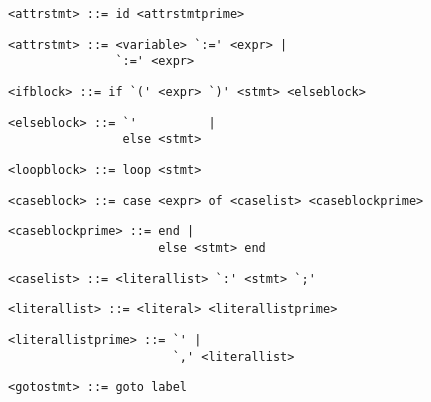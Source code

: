 \begin{footnotesize}
\begin{lstlisting}[frame=single, label={attrstmt}, language=pie]
<attrstmt> ::= id <attrstmtprime>
\end{lstlisting}

\begin{lstlisting}[frame=single, label={attrstmt}, language=pie]
<attrstmt> ::= <variable> `:=' <expr> |
               `:=' <expr>
\end{lstlisting}

\begin{lstlisting}[frame=single, label={ifblock}, language=pie]
<ifblock> ::= if `(' <expr> `)' <stmt> <elseblock> 
\end{lstlisting}


\begin{lstlisting}[frame=single, label={elseblock}, language=pie]
<elseblock> ::= `'          |
                else <stmt>
\end{lstlisting}

\begin{lstlisting}[frame=single, label={loopblock}, language=pie]
<loopblock> ::= loop <stmt>
\end{lstlisting}

\begin{lstlisting}[frame=single, label={caseblock}, language=pie]
<caseblock> ::= case <expr> of <caselist> <caseblockprime>
\end{lstlisting}

\begin{lstlisting}[frame=single, label={caseblockprime}, language=pie]
<caseblockprime> ::= end |
                     else <stmt> end
\end{lstlisting}

\begin{lstlisting}[frame=single, label={caselist}, language=pie]
<caselist> ::= <literallist> `:' <stmt> `;'
\end{lstlisting}

\begin{lstlisting}[frame=single, label={literallist}, language=pie]
<literallist> ::= <literal> <literallistprime>
\end{lstlisting}

\begin{lstlisting}[frame=single, label={literallistprime}, language=pie]
<literallistprime> ::= `' |
                       `,' <literallist> 
\end{lstlisting}

\begin{lstlisting}[frame=single, label={gotostmt}, language=pie]
<gotostmt> ::= goto label
\end{lstlisting}


\end{footnotesize}
